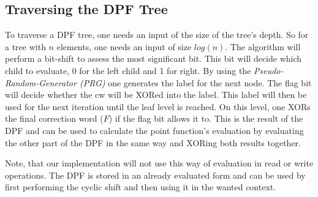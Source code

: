 \subsection{Traversing the DPF Tree}
\label{sub:TraversingTheDPFTree}
To traverse a DPF tree, one needs an input of the size of the tree's depth.
So for a tree with $n$ elements, one needs an input of size $log(n)$.
The algorithm will perform a bit-shift to assess the most significant bit.
This bit will decide which child to evaluate, 0 for the left child and 1 for right.
By using the \textit{Pseudo-Random-Generator (PRG)} one generates the label for the next node.
The flag bit will decide whether the cw will be XORed into the label.
This label will then be used for the next iteration until the leaf level is reached.
On this level, one XORs the final correction word ($F$) if the flag bit allows it to.
This is the result of the DPF and can be used to calculate the point function's evaluation by evaluating the other part of the DPF in the same way and XORing both results together.

Note, that our implementation will not use this way of evaluation in read or write operations.
The DPF is stored in an already evaluated form and can be used by first performing the cyclic shift and then using it in the wanted context.